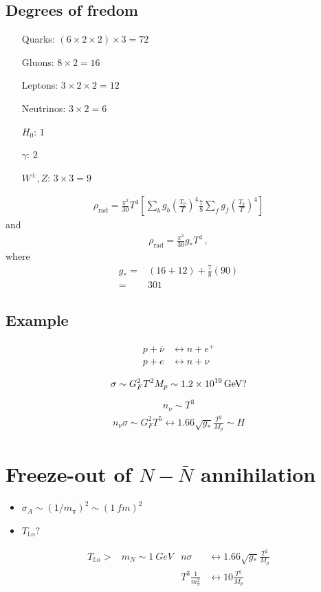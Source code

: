 \documentclass[12pt,letterpaper]{article}
\begin{document}
\subsection{Degrees of fredom}


\begin{itemize}
\item[Quarks:] $(6\times 2\times2)\times 3=72$
\item[Gluons:] $8\times 2=16$
\item[Leptons:] $3\times 2\times2=12$
\item[Neutrinos:] $3\times 2=6$
\item[$H_0$:] $1$
\item[$\gamma$:] $2$
\item[$W^{\pm},Z$:] $3\times3=9$
\end{itemize}

\begin{align}
  \rho_{\text{rad}}=\frac{\pi^2}{30}T^4
  \left[
\sum_b g_b
\left(
\frac{T_b}{T}
\right)^4
\frac{7}{8}\sum_f g_f
\left(
\frac{T_b}{T}
\right)^4
  \right]
\end{align}
and
\begin{align}
   \rho_{\text{rad}}=\frac{\pi^2}{30}g_* T^4\,,
\end{align}
where
\begin{align}
  g_*=&(16+12)+\frac{7}{8}(90)\nonumber\\
 =&301
\end{align}

\subsection*{Example}
\begin{align}
  p+\bar{\nu}&\longleftrightarrow n+e^+\nonumber\\
  p+e&\longleftrightarrow n+\nu\nonumber\\
\end{align}
\begin{align}
  \sigma\sim G_F^2 T^2 M_p \sim\SI{1.2E19}{GeV}?
\end{align}
\begin{align}
  n_\nu\sim  T^3
\end{align}
\begin{align}
  n_\nu\sigma\sim G_F^2 T^5\longleftrightarrow 1.66\sqrt{g_*}
\frac{T^2}{M_p}\sim H
\end{align}

\section{Freeze-out of $N-\bar{N}$ annihilation}
\begin{itemize}
\item $\sigma_A\sim (1/m_{\pi})^2\sim (\SI{1}{fm})^2$
\item $T_{\text{f.o}}?$
\end{itemize}
\begin{align}
  T_{\text{f.o}}>&m_N\sim \SI{1}{GeV} & n\sigma &\longleftrightarrow 1.66\sqrt{g_{*}}\frac{T^2}{M_p}\nonumber\\
&&  T^3 \frac{1}{m_{\pi}^2}& \longleftrightarrow 10 \frac{T^2}{M_p}
\end{align}
\end{document}
